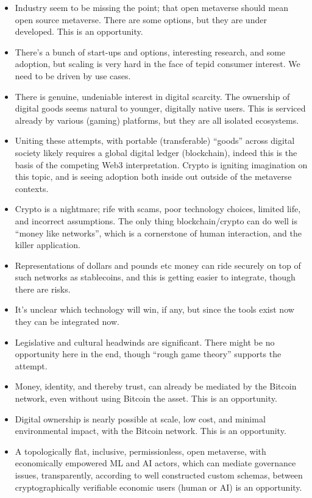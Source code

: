 {\begin{itemize}
\item Industry seem to be missing the point; that open metaverse should mean open source metaverse. There are some options, but they are under developed. This is an opportunity.
\item There's a bunch of start-ups and options, interesting research, and some adoption, but scaling is very hard in the face of tepid consumer interest. We need to be driven by use cases.
\item There is genuine, undeniable interest in digital scarcity. The ownership of digital goods seems natural to younger, digitally native users. This is serviced already by various (gaming) platforms, but they are all isolated ecosystems.
\item Uniting these attempts, with portable (transferable) ``goods'' across digital society likely requires a global digital ledger (blockchain), indeed this is the basis of the competing Web3 interpretation. Crypto is igniting imagination on this topic, and is seeing adoption both inside out outside of the metaverse contexts.
\item Crypto is a nightmare; rife with scams, poor technology choices, limited life, and incorrect assumptions. The only thing blockchain/crypto can do well is ``money like networks'', which is a cornerstone of human interaction, and the killer application.
\item Representations of dollars and pounds etc money can ride securely on top of such networks as stablecoins, and this is getting easier to integrate, though there are risks.
\item It's unclear which technology will win, if any, but since the tools exist now they can be integrated now.
\item Legislative and cultural headwinds are significant. There might be no opportunity here in the end, though ``rough game theory'' supports the attempt.
\item Money, identity, and thereby trust, can already be mediated by the Bitcoin network, even without using Bitcoin the asset. This is an opportunity.
\item Digital ownership is nearly possible at scale, low cost, and minimal environmental impact, with the Bitcoin network. This is an opportunity.
\item A topologically flat, inclusive, permissionless, open metaverse, with economically empowered ML and AI actors, which can mediate governance issues, transparently, according to well constructed custom schemas, between cryptographically verifiable economic users (human or AI) is an opportunity.

\end{itemize}}
